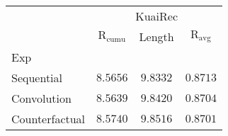 \begin{tabular}{lccc}
 & \multicolumn{3}{c}{KuaiRec} \\
 & $\text{R}_\text{cumu}$ & Length & $\text{R}_\text{avg}$ \\
Exp &  &  &  \\
Sequential & \underline{$8.5656$} & $9.8332$ & $\mathbf{0.8713}$ \\
Convolution & $8.5639$ & \underline{$9.8420$} & \underline{$0.8704$} \\
Counterfactual & $\mathbf{8.5740}$ & $\mathbf{9.8516}$ & $0.8701$ \\
\end{tabular}
